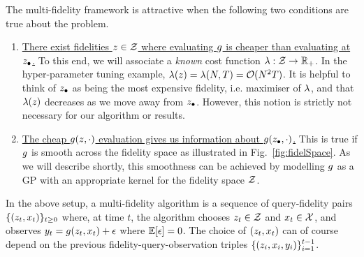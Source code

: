 The multi-fidelity framework is attractive when the following two conditions are true
about the problem.
\vspace{-0.10in}
\begin{enumerate}[leftmargin=0.19in]
\item
\ul{There exist fidelities $z\in\mathcal{Z}$ where evaluating $g$ is cheaper than
evaluating at $z_{\bullet}$.}
To this end, we will associate a \emph{known} cost function $\lambda:\mathcal{Z}\rightarrow
\mathbb{R}_+$.
In the hyper-parameter tuning example, $\lambda(z) = \lambda(N,T) = \mathcal{O}(N^2T)$.
It is helpful to think of $z_{\bullet}$ as being the most expensive fidelity,
i.e. maximiser of $\lambda$, and that $\lambda(z)$ decreases as we move away from
$z_{\bullet}$. 
However, this notion is strictly not necessary for our algorithm or results.\hspace{-0.1in}
\vspace{-0.06in}
\item
\ul{The cheap $g(z,\cdot)$ evaluation gives us information about
$g(z_{\bullet},\cdot)$.}
This is true if $g$ is smooth across the fidelity space
as illustrated in Fig.~\ref{fig:fidelSpace}.
As we will describe shortly, this smoothness can be achieved by modelling $g$ as
a GP
with an appropriate kernel for the fidelity space $\mathcal{Z}$.
\end{enumerate}
\vspace{-0.12in}

In the above setup, a multi-fidelity algorithm is a sequence of query-fidelity pairs
$\{(z_t,x_t)\}_{t\geq 0}$
where, at time $t$, the algorithm chooses $z_t\in\mathcal{Z}$ and $x_t\in\mathcal{X}$, and observes
$y_t = g(z_t,x_t) + \epsilon$ where $\mathbb{E}[\epsilon] = 0$.
The choice of $(z_t, x_t)$ can of course depend on the 
previous fidelity-query-observation triples $\{(z_i,x_i,y_i)\}_{i=1}^{t-1}$.


